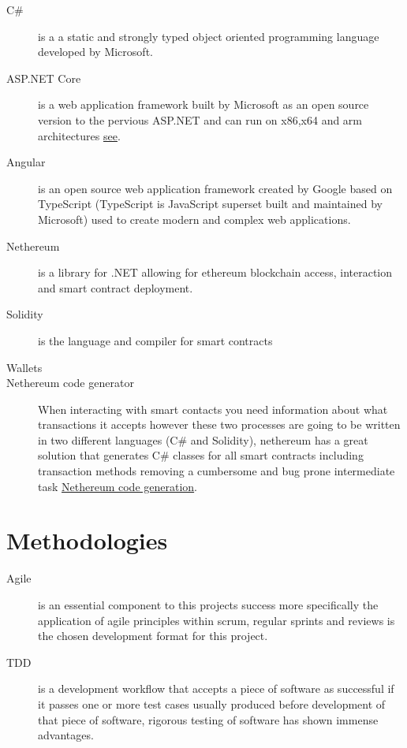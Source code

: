 \documentclass[12pt]{report}
\begin{document}
\begin{description}
	\item[C\#] is a a static and strongly typed object oriented programming language developed by Microsoft.
	\item[ASP.NET Core] is a web application framework built by Microsoft as an open source version to the pervious ASP.NET and can run on x86,x64 and arm architectures \href{https://docs.microsoft.com/en-us/aspnet/core/introduction-to-aspnet-core}{see}.
	\item[Angular] is an open source web application framework created by Google based on TypeScript (TypeScript is JavaScript superset built and maintained by Microsoft) used to create modern and complex web applications.
	\item[Nethereum] is a library for .NET allowing for ethereum blockchain access, interaction and smart contract deployment.
	\item[Solidity] is the language and compiler for smart contracts
	\item[Wallets] %
	\item[Nethereum code generator] When interacting with smart contacts you need information about what transactions it accepts however these two processes are going to be written in two different languages (C\# and Solidity), nethereum has a great solution that generates C\# classes for all smart contracts including transaction methods removing a cumbersome and bug prone intermediate task \href{https://docs.nethereum.com/en/latest/nethereum-code-generation/}{Nethereum code generation}.
\end{description}

\section{Methodologies}

\begin{description}
	\item[Agile] is an essential component to this projects success more specifically the application of agile principles within scrum, regular sprints and reviews is the chosen development format for this project.
	\item[TDD] is a development workflow that accepts a piece of software as successful if it passes one or more test cases usually produced before development of that piece of software, rigorous testing of software has shown immense advantages.
\end{description}
\end{document}
